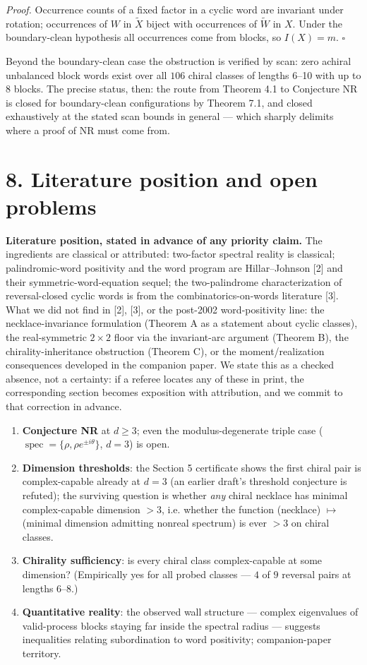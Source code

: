 \documentclass[11pt]{article}
\begin{document}
\emph{Proof.}  Occurrence counts of a fixed factor in a cyclic word are invariant under rotation; occurrences of $W$ in $\widetilde X$ biject with occurrences of $\widetilde W$ in $X$.  Under the boundary-clean hypothesis all occurrences come from blocks, so $I(X) = m$.  $\square$

Beyond the boundary-clean case the obstruction is verified by scan: zero achiral unbalanced block words exist over all $106$ chiral classes of lengths 6–10 with up to 8 blocks.  The precise status, then: the route from Theorem 4.1 to Conjecture NR is closed for boundary-clean configurations by Theorem 7.1, and closed exhaustively at the stated scan bounds in general — which sharply delimits where a proof of NR must come from.

\section*{8. Literature position and open problems}
\textbf{Literature position, stated in advance of any priority claim.} The ingredients are classical or attributed: two-factor spectral reality is classical; palindromic-word positivity and the word program are Hillar–Johnson [2] and their symmetric-word-equation sequel; the two-palindrome characterization of reversal-closed cyclic words is from the combinatorics-on-words literature [3]. What we did not find in [2], [3], or the post-2002 word-positivity line: the necklace-invariance formulation (Theorem A as a statement about cyclic classes), the real-symmetric $2\times 2$ floor via the invariant-arc argument (Theorem B), the chirality-inheritance obstruction (Theorem C), or the moment/realization consequences developed in the companion paper.  We state this as a checked absence, not a certainty: if a referee locates any of these in print, the corresponding section becomes exposition with attribution, and we commit to that correction in advance.

\begin{enumerate}
\item \textbf{Conjecture NR} at $d \ge 3$; even the modulus-degenerate triple case ($\operatorname{spec} = \{\rho, \rho e^{\pm i\theta}\}$, $d = 3$) is open.
\item \textbf{Dimension thresholds}: the Section 5 certificate shows the first chiral pair is complex-capable already at $d = 3$ (an earlier draft's threshold conjecture is refuted); the surviving question is whether \emph{any} chiral necklace has minimal complex-capable dimension $> 3$, i.e. whether the function (necklace) $\mapsto$ (minimal dimension admitting nonreal spectrum) is ever $> 3$ on chiral classes.
\item \textbf{Chirality sufficiency}: is every chiral class complex-capable at some dimension?  (Empirically yes for all probed classes — $4$ of $9$ reversal pairs at lengths $6$–$8$.)
\item \textbf{Quantitative reality}: the observed wall structure — complex eigenvalues of valid-process blocks staying far inside the spectral radius — suggests inequalities relating subordination to word positivity; companion-paper territory.
\end{enumerate}
\end{document}

